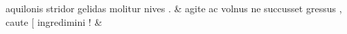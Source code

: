 \documentclass[12pt,onecolumn,twoside,a4paper]{memoir}
\begin{document}
\begin{pairs}
\begin{Leftside}
                              aquilonis
                              stridor
                              gelidas
                              molitur
                              nives
                              . \&
                         \stanza {}
                     agite
                              ac
                              volnus
                              ne
                              succusset
                              gressus
                              ,
                              caute
                              [
                              ingredimini
                              ! \&

                     
                  \endnumbering
		\end{Leftside}
                  \begin{Rightside}
			\beginnumbering
			\numberstanzafalse
                     

\end{Rightside}
\end{pairs}
\end{document}
